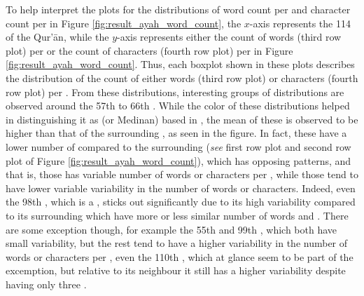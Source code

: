 To help interpret the plots for the distributions of word count per   and character count per   in Figure \ref{fig:result_ayah_word_count}, the $x$-axis represents the 114   of the Qur'\=an, while the $y$-axis represents either the count of words (third row plot) per   or the count of characters (fourth row plot) per   in Figure \ref{fig:result_ayah_word_count}. Thus, each boxplot shown in these plots describes the distribution of the count of either words (third row plot) or characters (fourth row plot) per  . From these distributions, interesting groups of distributions are observed around the 57th to 66th  . While the color of these distributions helped in distinguishing it as   (or Medinan) based in  , the mean of these     is observed to be higher than that of the surrounding  , as seen in the figure. In fact, these   have a lower number of   compared to the surrounding     (\textit{see} first row plot and second row plot of Figure \ref{fig:result_ayah_word_count}), which has opposing patterns, and that is, those     has variable number of words or characters per  , while those     tend to have lower variable variability in the number of words or characters. Indeed, even the 98th  , which is a  , sticks out significantly due to its high variability compared to its surrounding     which have more or less similar number of words and  . There are some exception though, for example the 55th and 99th  , which both have small variability, but the rest tend to have a higher variability in the number of words or characters per  , even the 110th  , which at glance seem to be part of the excemption, but relative to its neighbour it still has a higher variability despite having only three  . 

